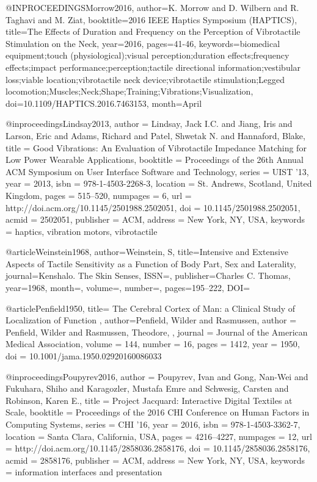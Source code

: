 @INPROCEEDINGS{Morrow2016, 
author={K. Morrow and D. Wilbern and R. Taghavi and M. Ziat}, 
booktitle={2016 IEEE Haptics Symposium (HAPTICS)}, 
title={{The Effects of Duration and Frequency on the Perception of Vibrotactile Stimulation on the Neck}}, 
year={2016}, 
pages={41-46}, 
keywords={biomedical equipment;touch (physiological);visual perception;duration effects;frequency effects;impact performance;perception;tactile directional information;vestibular loss;viable location;vibrotactile neck device;vibrotactile stimulation;Legged locomotion;Muscles;Neck;Shape;Training;Vibrations;Visualization}, 
doi={10.1109/HAPTICS.2016.7463153}, 
month={April}
}

@inproceedings{Lindsay2013,
 author = {Lindsay, Jack I.C. and Jiang, Iris and Larson, Eric and Adams, Richard and Patel, Shwetak N. and Hannaford, Blake},
 title = {{Good Vibrations: An Evaluation of Vibrotactile Impedance Matching for Low Power Wearable Applications}},
 booktitle = {Proceedings of the 26th Annual ACM Symposium on User Interface Software and Technology},
 series = {UIST '13},
 year = {2013},
 isbn = {978-1-4503-2268-3},
 location = {St. Andrews, Scotland, United Kingdom},
 pages = {515--520},
 numpages = {6},
 url = {http://doi.acm.org/10.1145/2501988.2502051},
 doi = {10.1145/2501988.2502051},
 acmid = {2502051},
 publisher = {ACM},
 address = {New York, NY, USA},
 keywords = {haptics, vibration motors, vibrotactile}
} 

@article{Weinstein1968,
author={Weinstein, S},
title={{Intensive and Extensive Aspects of Tactile Sensitivity as a Function of Body Part, Sex and Laterality}},
journal={{Kenshalo. The Skin Senses}},
ISSN={},
publisher={Charles C. Thomas},
year={1968},
month={},
volume={},
number={},
pages={195--222},
DOI={}
}

@article{Penfield1950,
title= {{The Cerebral Cortex of Man: a Clinical Study of Localization of Function}} ,
author={Penfield, Wilder and Rasmussen, author = {Penfield, Wilder and Rasmussen, Theodore},
},
journal = {Journal of the American Medical Association},
volume = {144},
number = {16},
pages = {1412},
year = {1950},
doi = {10.1001/jama.1950.02920160086033}
}

@inproceedings{Poupyrev2016,
 author = {Poupyrev, Ivan and Gong, Nan-Wei and Fukuhara, Shiho and Karagozler, Mustafa Emre and Schwesig, Carsten and Robinson, Karen E.},
 title = {{Project Jacquard: Interactive Digital Textiles at Scale}},
 booktitle = {Proceedings of the 2016 CHI Conference on Human Factors in Computing Systems},
 series = {CHI '16},
 year = {2016},
 isbn = {978-1-4503-3362-7},
 location = {Santa Clara, California, USA},
 pages = {4216--4227},
 numpages = {12},
 url = {http://doi.acm.org/10.1145/2858036.2858176},
 doi = {10.1145/2858036.2858176},
 acmid = {2858176},
 publisher = {ACM},
 address = {New York, NY, USA},
 keywords = {information interfaces and presentation}
}

